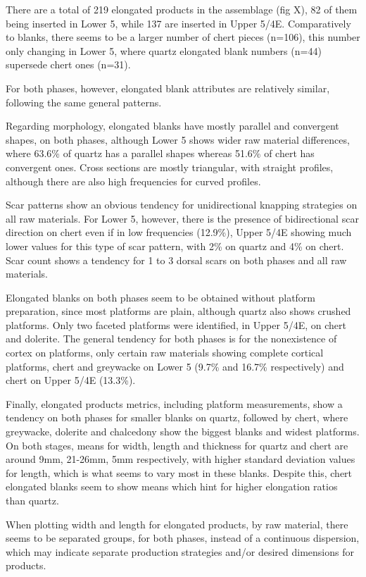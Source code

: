 \documentclass[12pt,twoside]{reedthesis}
\begin{document}
There are a total of 219 elongated products in the assemblage (fig X), 82 of them being inserted in Lower 5, while 137 are inserted in Upper 5/4E. Comparatively to blanks, there seems to be a larger number of chert pieces (n=106), this number only changing in Lower 5, where quartz elongated blank numbers (n=44) supersede chert ones (n=31).

For both phases, however, elongated blank attributes are relatively similar, following the same general patterns.

Regarding morphology, elongated blanks have mostly parallel and convergent shapes, on both phases, although Lower 5 shows wider raw material differences, where 63.6\% of quartz has a parallel shapes whereas 51.6\% of chert has convergent ones. Cross sections are mostly triangular, with straight profiles, although there are also high frequencies for curved profiles.

Scar patterns show an obvious tendency for unidirectional knapping strategies on all raw materials. For Lower 5, however, there is the presence of bidirectional scar direction on chert even if in low frequencies (12.9\%), Upper 5/4E showing much lower values for this type of scar pattern, with 2\% on quartz and 4\% on chert. Scar count shows a tendency for 1 to 3 dorsal scars on both phases and all raw materials.

Elongated blanks on both phases seem to be obtained without platform preparation, since most platforms are plain, although quartz also shows crushed platforms. Only two faceted platforms were identified, in Upper 5/4E, on chert and dolerite. The general tendency for both phases is for the nonexistence of cortex on platforms, only certain raw materials showing complete cortical platforms, chert and greywacke on Lower 5 (9.7\% and 16.7\% respectively) and chert on Upper 5/4E (13.3\%).

Finally, elongated products metrics, including platform measurements, show a tendency on both phases for smaller blanks on quartz, followed by chert, where greywacke, dolerite and chalcedony show the biggest blanks and widest platforms. On both stages, means for width, length and thickness for quartz and chert are around 9mm, 21-26mm, 5mm respectively, with higher standard deviation values for length, which is what seems to vary most in these blanks. Despite this, chert elongated blanks seem to show means which hint for higher elongation ratios than quartz.

When plotting width and length for elongated products, by raw material, there seems to be separated groups, for both phases, instead of a continuous dispersion, which may indicate separate production strategies and/or desired dimensions for products.
\end{document}
